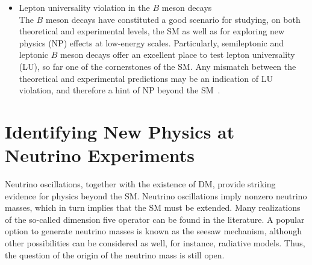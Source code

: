 \documentclass[a4paper,11pt]{article}
\begin{document}
\begin{enumerate}
\begin{itemize}
%
\item
Lepton universality violation in  the $B$ meson decays\\ 
The $B$ meson decays have constituted a good scenario for studying, on both theoretical and experimental levels, the SM as well as for exploring new physics (NP) effects at low-energy scales. Particularly, semileptonic and leptonic $B$ meson decays offer an excellent place to test lepton universality (LU), so far one of the cornerstones of the SM. Any mismatch between the theoretical and experimental predictions may be an indication of LU violation, and therefore a hint of NP beyond the SM~\cite{Bernal:2011pj, Greljo:2018tzh, Benavides:2018rgh, Gomez:2019xfw, Cardozo:2020uol}.
%
\end{itemize}
\end{enumerate}

\section{Identifying New Physics at Neutrino Experiments}
%
Neutrino oscillations, together with the existence of DM, provide striking evidence for physics beyond the SM. Neutrino oscillations imply nonzero neutrino masses, which in turn implies that the SM must be extended. Many realizations of the so-called dimension five operator can be found in the literature. A popular option to generate neutrino masses is known as the seesaw mechanism, although other possibilities can be considered as well, for instance, radiative models. Thus, the question of the origin of the neutrino mass is still open.
\end{document}
